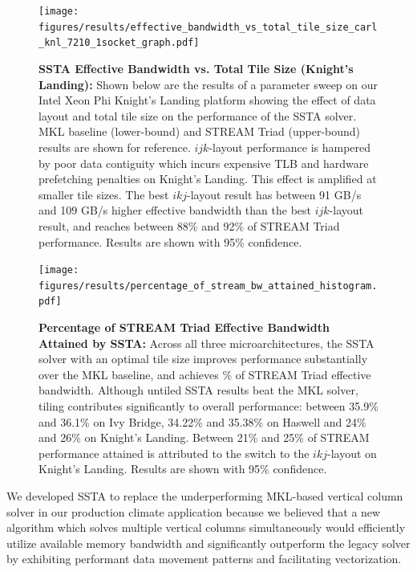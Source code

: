 \documentclass[10pt, conference, compsocconf]{IEEEtran}
\newcommand{\textapprox}{\texttildelow}
\begin{document}
\begin{figure}[!h]
  \centering
  \caption{\small
    \textbf{SSTA Effective Bandwidth vs. Total Tile Size (Knight's Landing):}
    Shown below are the results of a parameter sweep on our Intel Xeon Phi
      Knight's Landing platform showing the effect of data layout and total
      tile size on the performance of the SSTA solver.
    MKL baseline (lower-bound) and STREAM Triad (upper-bound) results are shown
      for reference.
    \(ijk\)-layout performance is hampered by poor data contiguity which incurs
      expensive TLB and hardware prefetching penalties on Knight's Landing.
    This effect is amplified at smaller tile sizes.
    The best \(ikj\)-layout result has between 91 GB/s and 109 GB/s higher
      effective bandwidth than the best \(ijk\)-layout result, and reaches
      between 88\% and 92\% of STREAM Triad performance.
    Results are shown with 95\% confidence.
  }
  \label{fig:results:bw_vs_tile_size_knl}
  \texttt{[image: figures/results/effective\_bandwidth\_vs\_total\_tile\_size\_carl\_knl\_7210\_1socket\_graph.pdf]}
\end{figure}

\begin{figure}[!h]
  \centering
  \caption{\small
    \textbf{Percentage of STREAM Triad Effective Bandwidth Attained by SSTA:}
    Across all three microarchitectures, the SSTA solver with an optimal tile
      size improves performance substantially over the MKL baseline, and
      achieves \textapprox 90\% of STREAM Triad effective bandwidth.
    Although untiled SSTA results beat the MKL solver, tiling contributes
      significantly to overall performance: between 35.9\% and 36.1\% on 
      Ivy Bridge, 34.22\% and 35.38\% on Haswell and 24\% and 26\% on 
      Knight's Landing.
    Between 21\% and 25\% of STREAM performance attained is attributed to the
      switch to the \(ikj\)-layout on Knight's Landing. 
    Results are shown with 95\% confidence.
  }
  \label{fig:results:percent_stream_bw}
  \texttt{[image: figures/results/percentage\_of\_stream\_bw\_attained\_histogram.pdf]}
\end{figure}

We developed SSTA to replace the underperforming MKL-based vertical column
  solver in our production climate application because we believed that a new
  algorithm which solves multiple vertical columns simultaneously would
  efficiently utilize available memory bandwidth and significantly outperform the
  legacy solver by exhibiting performant data movement patterns and facilitating
  vectorization.
\end{document}
